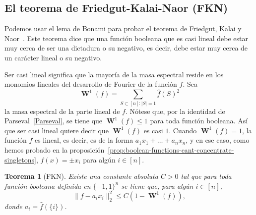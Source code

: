 \documentclass[autocontact]{gaceta}
\newtheorem{theorem}{Teorema}
\DeclareMathOperator{\WW}{\mathbf{W}}
\begin{document}
\subsection{El teorema de Friedgut-Kalai-Naor (FKN)}

Podemos usar el lema de Bonami para probar el teorema de Friedgut, Kalai y Naor~\cite{FKN02}. Este teorema dice que una función booleana que es casi lineal debe estar muy cerca de ser una dictadura o su negativo, es decir, debe estar muy cerca de un carácter lineal o su negativo.

Ser casi lineal significa que la mayoría de la masa espectral reside en los monomios lineales del desarrollo de Fourier de la función $f$. Sea
\[
   \WW^1(f) = \sum_{S\subset [n] \colon |S|=1} \widehat{f}(S)^2
\]
la masa espectral de la parte lineal de $f$. Nótese que, por la identidad de Parseval~\eqref{Parseval}, se tiene que $\WW^1(f)\leq 1$ para toda función booleana. Así que ser casi lineal quiere decir que $\WW^1(f)$ es casi $1$. Cuando $\WW^1(f)=1$, la función $f$ es lineal, es decir, es de la forma $a_1x_1+\dots +a_nx_n$, y en ese caso, como hemos probado en la proposición~\ref{prop:boolean-functions-cant-concentrate-singletons}, $f(x)=\pm x_i$ para algún $i\in [n]$.

\begin{theorem}[FKN]\label{thm:FKN}
Existe una constante absoluta $C>0$ tal que para toda función booleana definida en $\{-1,1\}^n$ se tiene que, para algún $i\in[n]$,
\[
\|f-a_i x_i\|_2^2\leq C(1-\WW^1(f)),
\]
donde $a_i = \widehat{f}(\{i\})$.
\end{theorem}
\end{document}
